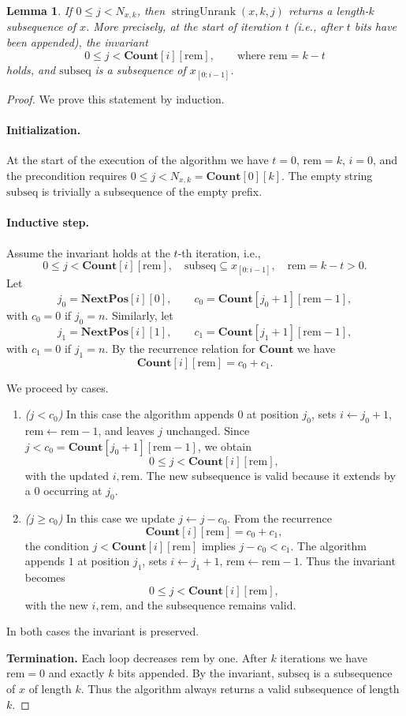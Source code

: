 \documentclass[11pt]{article}
\newcommand{\NextPos}{\mathbf{NextPos}}
\newcommand{\Cnt}{\mathbf{Count}}
\newcommand{\rem}{\mathrm{rem}}
\newcommand{\subseq}{\mathrm{subseq}}
\newcommand{\unrankk}{\operatorname{stringUnrank}}
\newtheorem{lemma}{Lemma}
\begin{document}
\begin{lemma}\label{lem:surj}
If $0\le j<N_{x,k}$, then $\unrankk(x,k,j)$ returns a length-$k$ subsequence of $x$. 
More precisely, at the start of iteration $t$ (i.e., after $t$ bits have been appended), the invariant
\[
0 \le j < \Cnt[i][\rem],\qquad \text{where }\rem=k-t
\]
holds, and $\subseq$ is a subsequence of $x_{[0: i-1]}$.
\end{lemma}

\begin{proof}
We prove this statement by induction.

\paragraph{Initialization.} At the start of the execution of the algorithm we have $t=0$, $\rem=k$, $i=0$, and the precondition requires $0\leq j<N_{x,k}=\Cnt[0][k]$.  
The empty string $\subseq$ is trivially a subsequence of the empty prefix.


\paragraph{Inductive step.}  
Assume the invariant holds at the $t$-th iteration, i.e.,
\[
    0 \le j < \Cnt[i][\rem],
    \quad \subseq \subseteq x_{[0: i-1]},
    \quad \rem=k-t>0.
\]
Let
\[
j_0 = \NextPos[i][0], 
\qquad 
c_0 = \Cnt[j_0+1][\rem-1],
\]
with $c_0=0$ if $j_0=n$.  
Similarly, let
\[
j_1 = \NextPos[i][1], 
\qquad 
c_1 = \Cnt[j_1+1][\rem-1],
\]
with $c_1=0$ if $j_1=n$.  
By the recurrence relation for $\Cnt$ we have
\[
\Cnt[i][\rem] = c_0 + c_1.
\]

We proceed by cases.
\begin{enumerate}
    \item \emph{($j<c_0$)} In this case the algorithm appends $0$ at position $j_0$, sets $i\gets j_0+1$, $\rem\gets\rem-1$, and leaves $j$ unchanged.  
    Since $j<c_0=\Cnt[j_0+1][\rem-1]$, we obtain
    \[
    0 \le j < \Cnt[i][\rem],
    \]
    with the updated $i,\rem$. The new subsequence is valid because it extends by a $0$ occurring at $j_0$.

    \item \emph{($j\ge c_0$)}  
In this case we update $j\gets j-c_0$. From the recurrence
\[
\Cnt[i][\rem]=c_0+c_1,
\]
the condition $j<\Cnt[i][\rem]$ implies $j-c_0<c_1$.  
The algorithm appends $1$ at position $j_1$, sets $i\gets j_1+1$, $\rem\gets\rem-1$.  
Thus the invariant becomes
\[
0 \le j < \Cnt[i][\rem],
\]
with the new $i,\rem$, and the subsequence remains valid.
\end{enumerate}  


In both cases the invariant is preserved.

\medskip\noindent
\textbf{Termination.}  
Each loop decreases $\rem$ by one. After $k$ iterations we have $\rem=0$ and exactly $k$ bits appended. By the invariant, $\subseq$ is a subsequence of $x$ of length $k$. Thus the algorithm always returns a valid subsequence of length $k$.
\end{proof}
\end{document}
